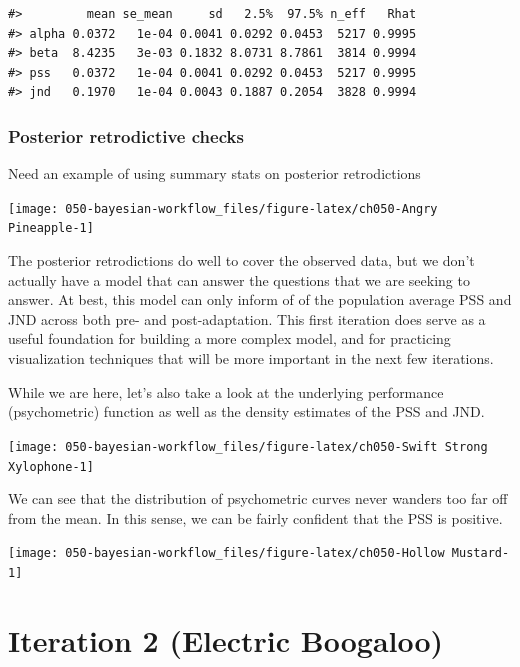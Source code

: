 \documentclass[11pt, oneside, openany]{scrbook}
\begin{document}
\begin{verbatim}
#>         mean se_mean     sd   2.5%  97.5% n_eff   Rhat
#> alpha 0.0372   1e-04 0.0041 0.0292 0.0453  5217 0.9995
#> beta  8.4235   3e-03 0.1832 8.0731 8.7861  3814 0.9994
#> pss   0.0372   1e-04 0.0041 0.0292 0.0453  5217 0.9995
#> jnd   0.1970   1e-04 0.0043 0.1887 0.2054  3828 0.9994
\end{verbatim}


\hypertarget{posterior-retrodictive-checks}{%
\subsubsection{Posterior retrodictive checks}\label{posterior-retrodictive-checks}}

Need an example of using summary stats on posterior retrodictions

\begin{center}\texttt{[image: 050-bayesian-workflow\_files/figure-latex/ch050-Angry Pineapple-1]} \end{center}

The posterior retrodictions do well to cover the observed data, but we don't actually have a model that can answer the questions that we are seeking to answer. At best, this model can only inform of of the population average PSS and JND across both pre- and post-adaptation. This first iteration does serve as a useful foundation for building a more complex model, and for practicing visualization techniques that will be more important in the next few iterations.

While we are here, let's also take a look at the underlying performance (psychometric) function as well as the density estimates of the PSS and JND.

\begin{center}\texttt{[image: 050-bayesian-workflow\_files/figure-latex/ch050-Swift Strong Xylophone-1]} \end{center}

We can see that the distribution of psychometric curves never wanders too far off from the mean. In this sense, we can be fairly confident that the PSS is positive.

\begin{center}\texttt{[image: 050-bayesian-workflow\_files/figure-latex/ch050-Hollow Mustard-1]} \end{center}

\hypertarget{iteration-2-electric-boogaloo}{%
\section{Iteration 2 (Electric Boogaloo)}\label{iteration-2-electric-boogaloo}}
\end{document}
